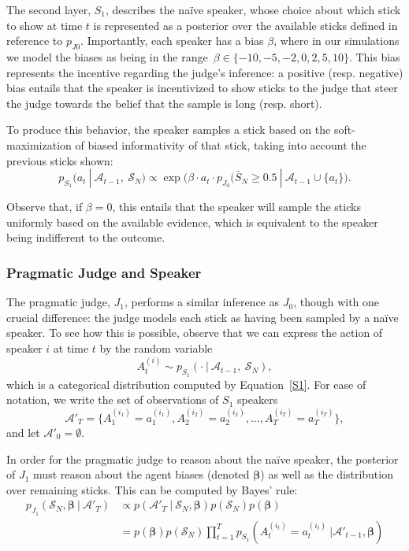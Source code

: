 \documentclass[10pt,letterpaper]{article}
\begin{document}
The second layer, $S_1$, describes the na\"ive speaker, whose choice about which stick to show
at time $t$ is represented as a posterior over the available sticks defined in reference to $p_{J0}$.
Importantly, each speaker has a bias $\beta$, where in our simulations we model the biases as being
in the range~${\beta \in \{-10, -5, -2, 0, 2, 5, 10\}}$. This bias represents the incentive regarding the judge's
inference: a positive (resp. negative) bias entails that the speaker is incentivized to show sticks to the judge
that steer the judge towards the belief that the sample is long (resp. short).

To produce this behavior, the speaker samples a stick based on the soft-maximization of biased informativity
of that stick, taking into account the previous sticks shown:
\begin{equation}\label{S1}
p_{S_1} (a_t \ | \ \mathcal{A}_{t-1},\ \mathcal{S}_N) \propto \exp \bigl(\beta \cdot a_t \cdot p_{J_0} (\bar{S}_N \ge 0.5 \ | \ \mathcal{A}_{t-1} \cup \{a_t\} \bigr).
\end{equation}

Observe that, if $\beta = 0$, this entails that the speaker will sample the sticks uniformly based on the available
evidence, which is equivalent to the speaker being indifferent to the outcome.

\subsubsection{Pragmatic Judge and Speaker}
The pragmatic judge, $J_1$, performs a similar inference as $J_0$, though with one crucial difference: the judge
models each stick as having been sampled by a na\"ive speaker. To see how this is possible, observe that we can express
the action of speaker $i$ at time $t$ by the random variable 
\begin{equation}
	A_t^{(i)} \sim p_{S_1} (\cdot \ | \ \mathcal{A}_{t-1},\ \mathcal{S}_N),
\end{equation}
which is a categorical distribution computed by Equation~\ref{S1}. For ease of notation, we write the set
of observations of $S_1$ speakers
\begin{equation}
	\mathcal{A}'_T = \{ A_1^{(i_1)}=a_1^{(i_1)}, A_2^{(i_2)}=a_2^{(i_2)}, ..., A_T^{(i_T)}=a_T^{(i_T)}\}, 
\end{equation}
and let $\mathcal{A}'_0 = \emptyset$.

In order for the pragmatic judge to reason about the na\"ive speaker, the posterior of $J_1$ must reason about the agent
biases (denoted $\bm{\beta}$) as well as the distribution over remaining sticks. This can be computed by Bayes' rule:
\begin{align*}
	p_{J_1} (\mathcal{S}_N, \bm{\beta} \ | \ \mathcal{A}'_T) &\propto p(\mathcal{A}'_T \ | \ \mathcal{S}_N, \bm{\beta}) p(\mathcal{S}_N) p(\bm{\beta}) \\
	&= p(\bm{\beta}) p(\mathcal{S}_N) \prod_{t=1}^T p_{S_1}(A_t^{(i_t)}=a_t^{(i_t)} \ |  \mathcal{A}'_{t-1}, \bm{\beta})
\end{align*}
\end{document}
